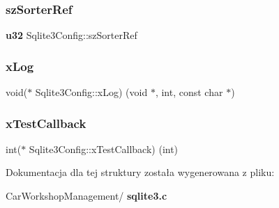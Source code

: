 \mbox{\label{struct_sqlite3_config_a8bdcc8caffe59bb5f7ac2c4d44fcca46}} 
\subsubsection{szSorterRef}
{\footnotesize\ttfamily \textbf{ u32} Sqlite3\+Config\+::sz\+Sorter\+Ref}

\mbox{\label{struct_sqlite3_config_a3d9750f6c4fc73fdce5f83357184faae}} 
\subsubsection{xLog}
{\footnotesize\ttfamily void($\ast$ Sqlite3\+Config\+::x\+Log) (void $\ast$, int, const char $\ast$)}

\mbox{\label{struct_sqlite3_config_a6d21468c424041f10eb0c251220088f6}} 
\subsubsection{xTestCallback}
{\footnotesize\ttfamily int($\ast$ Sqlite3\+Config\+::x\+Test\+Callback) (int)}



Dokumentacja dla tej struktury została wygenerowana z pliku\+:\begin{DoxyCompactItemize}
\item 
Car\+Workshop\+Management/\textbf{ sqlite3.\+c}\end{DoxyCompactItemize}
